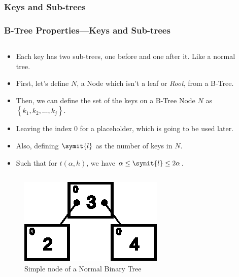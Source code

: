 \begin{frame}
    \subsubsection{Keys and Sub-trees}
    \frametitle{B-Tree Properties---Keys and Sub-trees}
    \begin{columns}
        \begin{column}{\textlecolumn}
            \begin{block}{}
                \vspace{-0.8cm}
                \begin{itemize}
                    \item Each key has two sub-trees, one before and one after it. Like a normal tree.
                    \item First, let's define \(N\), a Node which isn't a leaf or \emph{Root}, from a B-Tree.
                    \item Then, we can define the set of the keys on a B-Tree Node \(N\) as \(\left\{k_1, k_2, \ldots{}, k_j\right\}\).
                    \item Leaving the index 0 for a placeholder, which is going to be used later.
                    \item Also, defining \(\symit{l}\) as the number of keys in \(N\).
                    \item Such that for \(t\left(\alpha, h\right)\), we have \(\alpha \leq \symit{l} \leq 2\alpha\).
                \end{itemize}
            \end{block}
        \end{column}
        \begin{column}{\textricolumn}
        \end{column}
    \end{columns}
    \begin{figure}[h!]
        \includegraphics[height=0.175\linewidth]{resources/made/btree_2subtrees.eps}
        \caption{Simple node of a Normal Binary Tree}
    \end{figure}

    \framebreak


\end{frame}
